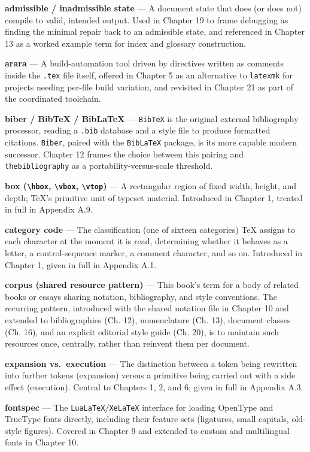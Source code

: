 \textbf{admissible / inadmissible state} --- A document state that does (or does not) compile to valid, intended output. Used in Chapter 19 to frame debugging as finding the minimal repair back to an admissible state, and referenced in Chapter 13 as a worked example term for index and glossary construction.

\textbf{arara} --- A build-automation tool driven by directives written as comments inside the \texttt{.tex} file itself, offered in Chapter 5 as an alternative to \texttt{latexmk} for projects needing per-file build variation, and revisited in Chapter 21 as part of the coordinated toolchain.

\textbf{biber / BibTeX / BibLaTeX} --- \texttt{BibTeX} is the original external bibliography processor, reading a \texttt{.bib} database and a style file to produce formatted citations. \texttt{Biber}, paired with the \texttt{BibLaTeX} package, is its more capable modern successor. Chapter 12 frames the choice between this pairing and \texttt{thebibliography} as a portability-versus-scale threshold.

\textbf{box (\texttt{\textbackslash{}hbox}, \texttt{\textbackslash{}vbox}, \texttt{\textbackslash{}vtop})} --- A rectangular region of fixed width, height, and depth; TeX's primitive unit of typeset material. Introduced in Chapter 1, treated in full in Appendix A.9.

\textbf{category code} --- The classification (one of sixteen categories) TeX assigns to each character at the moment it is read, determining whether it behaves as a letter, a control-sequence marker, a comment character, and so on. Introduced in Chapter 1, given in full in Appendix A.1.

\textbf{corpus (shared resource pattern)} --- This book's term for a body of related books or essays sharing notation, bibliography, and style conventions. The recurring pattern, introduced with the shared notation file in Chapter 10 and extended to bibliographies (Ch. 12), nomenclature (Ch. 13), document classes (Ch. 16), and an explicit editorial style guide (Ch. 20), is to maintain such resources once, centrally, rather than reinvent them per document.

\textbf{expansion vs.~execution} --- The distinction between a token being rewritten into further tokens (expansion) versus a primitive being carried out with a side effect (execution). Central to Chapters 1, 2, and 6; given in full in Appendix A.3.

\textbf{fontspec} --- The \texttt{LuaLaTeX}/\texttt{XeLaTeX} interface for loading OpenType and TrueType fonts directly, including their feature sets (ligatures, small capitals, old-style figures). Covered in Chapter 9 and extended to custom and multilingual fonts in Chapter 10.

